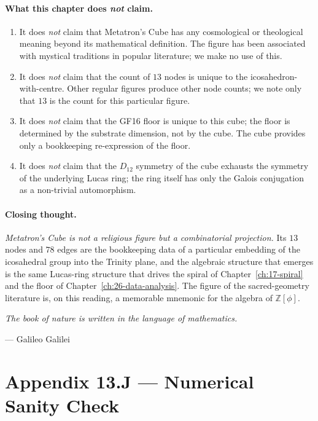 \paragraph{What this chapter does \emph{not} claim.}

\begin{enumerate}
\item It does \emph{not} claim that Metatron's Cube has any
  cosmological or theological meaning beyond its mathematical
  definition. The figure has been associated with mystical
  traditions in popular literature; we make no use of this.
\item It does \emph{not} claim that the count of $13$ nodes is
  unique to the icosahedron-with-centre. Other regular figures
  produce other node counts; we note only that $13$ is the count
  for this particular figure.
\item It does \emph{not} claim that the GF16 floor is unique to
  this cube; the floor is determined by the substrate dimension,
  not by the cube. The cube provides only a bookkeeping
  re-expression of the floor.
\item It does \emph{not} claim that the $D_{12}$ symmetry of the
  cube exhausts the symmetry of the underlying Lucas ring; the
  ring itself has only the Galois conjugation as a non-trivial
  automorphism.
\end{enumerate}

\paragraph{Closing thought.}
\emph{Metatron's Cube is not a religious figure but a combinatorial
projection.} Its $13$ nodes and $78$ edges are the bookkeeping data
of a particular embedding of the icosahedral group into the Trinity
plane, and the algebraic structure that emerges is the same
Lucas-ring structure that drives the spiral of
Chapter~\ref{ch:17-spiral} and the floor of
Chapter~\ref{ch:26-data-analysis}. The figure of the
sacred-geometry literature is, on this reading, a memorable mnemonic
for the algebra of $\mathbb{Z}[\phi]$.

\begin{flushright}
\textit{The book of nature is written in the language of mathematics.}\par
\hfill --- Galileo Galilei
\end{flushright}

\section*{Appendix 13.J --- Numerical Sanity Check}
\label{sec:13-appJ}

